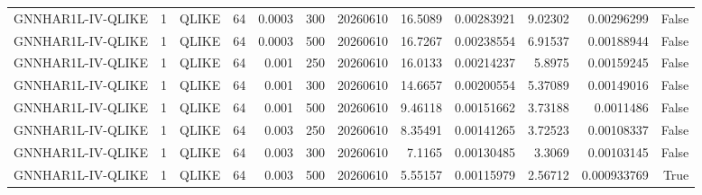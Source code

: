 \begin{tabular}{lrlrrrrrrrrr}
GNNHAR1L-IV-QLIKE & 1 & QLIKE & 64 & 0.0003 & 300 & 20260610 & 16.5089 & 0.00283921 & 9.02302 & 0.00296299 & False \\
GNNHAR1L-IV-QLIKE & 1 & QLIKE & 64 & 0.0003 & 500 & 20260610 & 16.7267 & 0.00238554 & 6.91537 & 0.00188944 & False \\
GNNHAR1L-IV-QLIKE & 1 & QLIKE & 64 & 0.001 & 250 & 20260610 & 16.0133 & 0.00214237 & 5.8975 & 0.00159245 & False \\
GNNHAR1L-IV-QLIKE & 1 & QLIKE & 64 & 0.001 & 300 & 20260610 & 14.6657 & 0.00200554 & 5.37089 & 0.00149016 & False \\
GNNHAR1L-IV-QLIKE & 1 & QLIKE & 64 & 0.001 & 500 & 20260610 & 9.46118 & 0.00151662 & 3.73188 & 0.0011486 & False \\
GNNHAR1L-IV-QLIKE & 1 & QLIKE & 64 & 0.003 & 250 & 20260610 & 8.35491 & 0.00141265 & 3.72523 & 0.00108337 & False \\
GNNHAR1L-IV-QLIKE & 1 & QLIKE & 64 & 0.003 & 300 & 20260610 & 7.1165 & 0.00130485 & 3.3069 & 0.00103145 & False \\
GNNHAR1L-IV-QLIKE & 1 & QLIKE & 64 & 0.003 & 500 & 20260610 & 5.55157 & 0.00115979 & 2.56712 & 0.000933769 & True \\
\bottomrule
\end{tabular}
